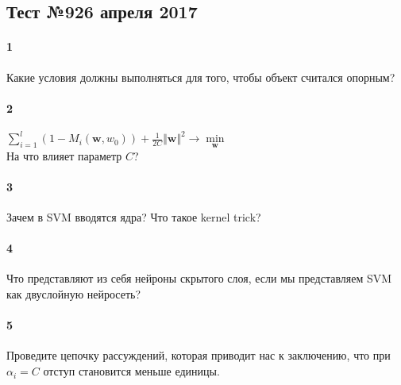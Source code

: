 \documentclass[a4paper,12pt]{article}
\begin{document}
  \subsection*{Тест №9\hfill{26 апреля 2017}}

  
  \paragraph{1} Какие условия должны выполняться для того, чтобы объект считался опорным?

  \makebox[\linewidth]{\hrulefill}
  \makebox[\linewidth]{\hrulefill}

  \paragraph{2} $ \sum\limits_{i=1}^l (1 - M_i(\mathbf{w}, w_0)) + \frac{1}{2C}\Vert \mathbf{w} \Vert^2 \rightarrow \min\limits_{\mathbf{w}}$\\
  На что влияет параметр $C$?
	
  \makebox[\linewidth]{\hrulefill}
  \makebox[\linewidth]{\hrulefill}
  \makebox[\linewidth]{\hrulefill}
	
  \paragraph{3} Зачем в SVM вводятся ядра? Что такое kernel trick?

  \makebox[\linewidth]{\hrulefill}
  \makebox[\linewidth]{\hrulefill}

  \paragraph{4} Что представляют из себя нейроны скрытого слоя, если мы представляем SVM как двуслойную нейросеть?

  \makebox[\linewidth]{\hrulefill}
  \makebox[\linewidth]{\hrulefill}
  \makebox[\linewidth]{\hrulefill}
  \makebox[\linewidth]{\hrulefill}

  \paragraph{5} Проведите цепочку рассуждений, которая приводит нас к заключению, что при $\alpha_i = C$ отступ становится меньше единицы.

  \makebox[\linewidth]{\hrulefill}
  \makebox[\linewidth]{\hrulefill}
  \makebox[\linewidth]{\hrulefill}
  \makebox[\linewidth]{\hrulefill}
  \makebox[\linewidth]{\hrulefill}
 
\end{document}
